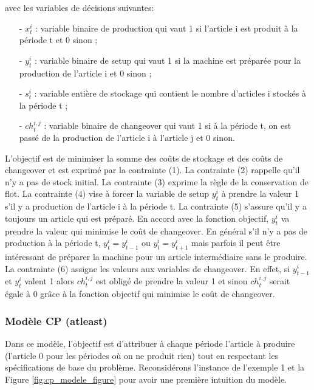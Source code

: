 \documentclass[12pt,a4paper]{article}
\begin{document}
		avec les variables de décisions suivantes: \\
		\begin{itemize}
			\item[-] $x_{t}^{i}$ : variable binaire de production qui vaut 1 si l’article i est produit à la période t et 0 sinon ;
			\item[-] $y_{t}^{i}$ : variable binaire de setup qui vaut 1 si la machine est préparée pour la production de l’article i et 0 sinon ;
			\item[-] $s_{t}^{i}$ : variable entière de stockage qui contient le nombre d’articles i stockés à la période t ; 
			\item[-] $ch_{t}^{i,j}$ : variable binaire de changeover qui vaut 1 si à la période t, on est passé de la production de l’article i à l’article j et 0 sinon.
		\end{itemize}
		\vspace*{.3cm}
	\hspace*{.5cm} L'objectif est de minimiser la somme des coûts de stockage et des coûts de changeover et est exprimé par la contrainte (1). La contrainte (2) rappelle qu'il n'y a pas de stock initial. La contrainte (3) exprime la règle de la conservation de flot. La contrainte (4) vise à forcer la variable de setup $y_{t}^{i}$ à prendre la valeur 1 s’il y a production de l’article i à la période t. La contrainte (5) s'assure qu'il y a toujours un article qui est préparé. En accord avec la fonction objectif, $y_{t}^{i}$ va prendre la valeur qui minimise le coût de changeover. En général s’il n’y a pas de production à la période t,
$y_{t}^{i} = y_{t-1}^{i}$ ou $y_{t}^{i} = y_{t+1}^{i}$
mais parfois il peut être intéressant de préparer
la machine pour un article intermédiaire sans le produire. La contrainte (6) assigne les valeurs aux variables de changeover.
En effet, si $y_{t-1}^{i}$ et $y_{t}^{i}$ valent 1 alors $ch_{t}^{i,j}$ est obligé de prendre la valeur 1 et sinon $ch_{t}^{i,j}$ serait égale à 0 grâce à la fonction objectif qui minimise le coût de changeover.
		
		\subsubsection{Modèle CP (atleast)}
		Dans ce modèle, l’objectif est d’attribuer à chaque période l’article à produire (l’article 0 pour les périodes où on ne produit rien) tout en respectant les spécifications de base du problème. Reconsidérons l’instance de l’exemple 1 et la Figure \ref{fig:cp_modele_figure} pour avoir une première intuition du modèle. 
		
\end{document}
